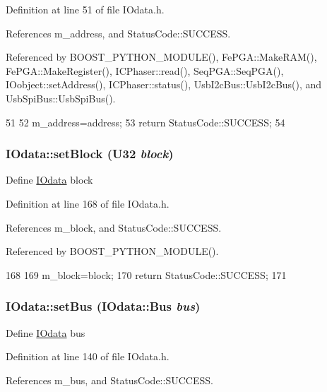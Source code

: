 Definition at line 51 of file IOdata.h.

References m\_\-address, and StatusCode::SUCCESS.

Referenced by BOOST\_\-PYTHON\_\-MODULE(), FePGA::MakeRAM(), FePGA::MakeRegister(), ICPhaser::read(), SeqPGA::SeqPGA(), IOobject::setAddress(), ICPhaser::status(), UsbI2cBus::UsbI2cBus(), and UsbSpiBus::UsbSpiBus().


\begin{DoxyCode}
51                                     {
52     m_address=address;
53     return StatusCode::SUCCESS;
54   }
\end{DoxyCode}
\hypertarget{classIOdata_a334f07d85e3dc8069551dcd8ab942e9c}{
\subsubsection[{setBlock}]{ IOdata::setBlock ({\bf U32} {\em block})}}
\label{classIOdata_a334f07d85e3dc8069551dcd8ab942e9c}
Define \hyperlink{classIOdata}{IOdata} block 

Definition at line 168 of file IOdata.h.

References m\_\-block, and StatusCode::SUCCESS.

Referenced by BOOST\_\-PYTHON\_\-MODULE().


\begin{DoxyCode}
168                                 {
169     m_block=block;
170     return StatusCode::SUCCESS;
171   }
\end{DoxyCode}
\hypertarget{classIOdata_aca154b90e490608b5b5c0ead58e1fafc}{
\subsubsection[{setBus}]{ IOdata::setBus ({\bf IOdata::Bus} {\em bus})}}
\label{classIOdata_aca154b90e490608b5b5c0ead58e1fafc}
Define \hyperlink{classIOdata}{IOdata} bus 

Definition at line 140 of file IOdata.h.

References m\_\-bus, and StatusCode::SUCCESS.


